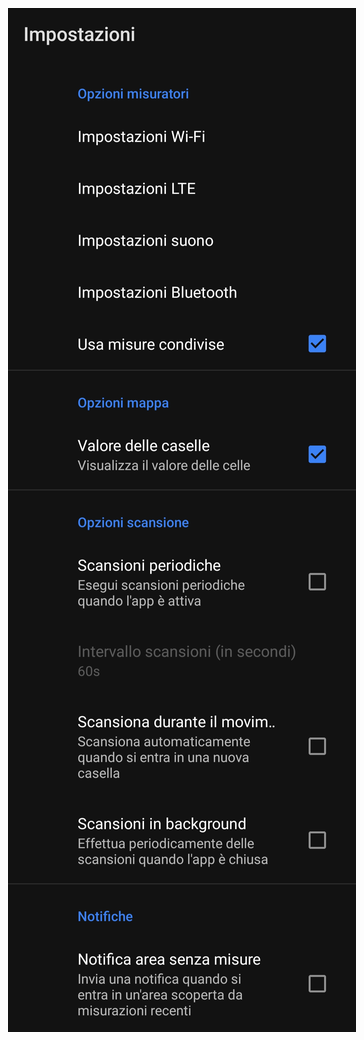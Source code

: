 \documentclass[11pt]{article}
\begin{document}
\begin{minipage}[b]{0.45\textwidth}
  \begin{figure}[H]
    \centering
    \begin{minipage}[b]{0.35\textwidth}
      \includegraphics[width=\textwidth]{./img/overview/settings1.jpg}

\end{minipage}
\end{figure}
\end{minipage}
\end{document}
